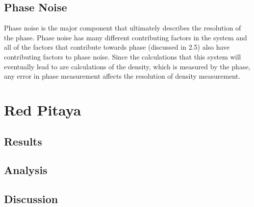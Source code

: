 \documentclass[12pt,a4paper,oneside]{report}
\begin{document}
\section{Phase Noise}
Phase noise is the major component that ultimately describes the resolution of the phase. Phase noise has many different contributing factors in the system and all of the factors that contribute towards phase (discussed in 2.5) also have contributing factors to phase noise. Since the calculations that this system will eventually lead to are calculations of the density, which is measured by the phase, any error in phase measurement affects the resolution of density measurement.

\chapter{Red Pitaya}

\section{Results}

\section{Analysis}

\section{Discussion}

\end{document}
